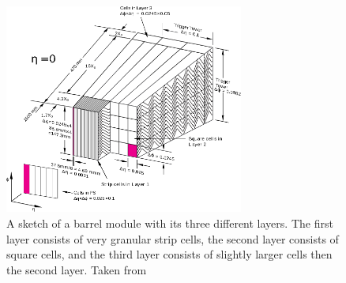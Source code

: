 \begin{figure}[htp]
    \centering
    \includegraphics[width=0.7\textwidth]{figures/atlas/atlas_lar_module_cells.png}
    \caption{A sketch of a barrel module with its three different layers. The first layer consists of very granular strip cells, the second layer consists of square cells, and the third layer consists of slightly larger cells then the second layer. Taken from~\cite{atlas_calorimeter_module_accordion}}\label{fig:atlas_calorimeter_module}
\end{figure}

